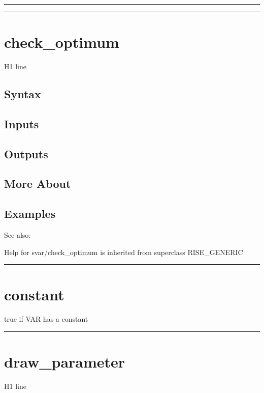 \documentclass[letterpaper,10pt,english]{sphinxmanual}
\begin{document}
\bigskip\hrule{}\bigskip



\bigskip\hrule{}\bigskip



\section{check\_optimum}
\label{classes/models/@svar/svar:check-optimum}\label{classes/models/@svar/svar:id1}
H1 line


\subsection{Syntax}
\label{classes/models/@svar/svar:syntax}

\subsection{Inputs}
\label{classes/models/@svar/svar:inputs}

\subsection{Outputs}
\label{classes/models/@svar/svar:outputs}

\subsection{More About}
\label{classes/models/@svar/svar:more-about}

\subsection{Examples}
\label{classes/models/@svar/svar:examples}
See also:

Help for svar/check\_optimum is inherited from superclass RISE\_GENERIC


\bigskip\hrule{}\bigskip



\section{constant}
\label{classes/models/@svar/svar:id2}\label{classes/models/@svar/svar:constant}
true if VAR has a constant


\bigskip\hrule{}\bigskip



\section{draw\_parameter}
\label{classes/models/@svar/svar:id3}\label{classes/models/@svar/svar:draw-parameter}
H1 line
\end{document}
